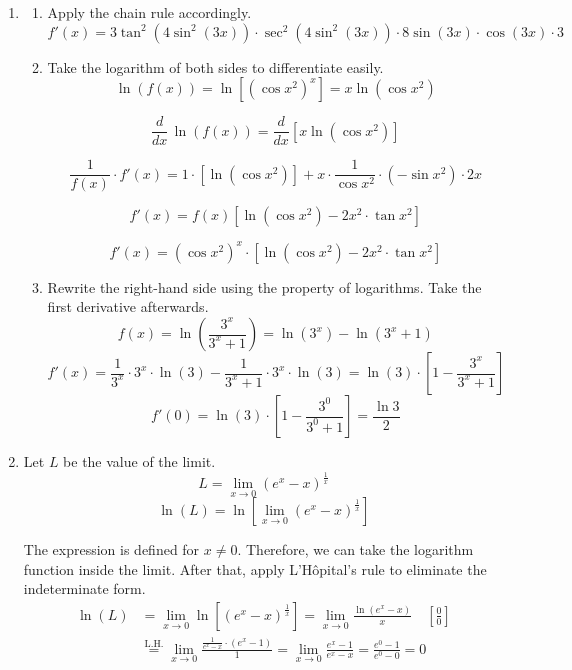 \documentclass[a4paper, 12pt]{article}
\begin{document}
\begin{enumerate}[leftmargin=*,label=\textbf{\arabic*.}]
\item
\begin{enumerate}[leftmargin=*,label=\textbf{\alph*.}]
\item Apply the chain rule accordingly.
\[\boxed{f'(x) = 3\tan^2\left(4\sin^2(3x)\right)\cdot \sec^2\left(4\sin^2(3x)\right)\cdot8\sin(3x)\cdot \cos(3x)\cdot 3}\]

\item Take the logarithm of both sides to differentiate easily.
\[\ln\left(f(x)\right)=\ln\left[\left(\cos x^2\right)^x\right]=x\ln\left(\cos x^2\right)\]

\[\frac{d}{dx}\,\ln\left(f(x)\right)=\frac{d}{dx}\left[x\ln\left(\cos x^2\right)\right]\]

\[\frac1{f(x)}\cdot f'(x)=1\cdot\left[\ln\left(\cos x^2\right)\right]+x\cdot\frac1{\cos x^2}\cdot\left(-\sin x^2\right)\cdot2x\]

\[f'(x)=f(x)\left[\ln\left(\cos x^2\right)-2x^2\cdot\tan x^2\right]\]

\[\boxed{f'(x)=\left(\cos x^2\right)^x\cdot\left[\ln\left(\cos x^2\right)-2x^2\cdot\tan x^2\right]}\]

\item Rewrite the right-hand side using the property of logarithms. Take the first derivative afterwards.
\[f(x)=\ln\left(\frac{3^x}{3^x+1}\right)=\ln\left(3^x\right)-\ln\left(3^x+1\right)\]
\[f'(x)=\frac1{3^x}\cdot 3^x\cdot\ln(3)-\frac1{3^x+1}\cdot3^x\cdot\ln(3)=\ln(3)\cdot\left[1-\frac{3^x}{3^x+1}\right]\]
\[f'(0)=\ln(3)\cdot\left[1-\frac{3^0}{3^0+1}\right]=\boxed{\frac{\ln3}2}\]
\end{enumerate}

\item Let $L$ be the value of the limit.
\[L = \lim_{x\to0}\left( e^x-x\right)^{\frac1x}\]
\[\ln(L) = \ln\left[\lim_{x\to0}\left( e^x-x\right)^{\frac1x}\right]\]

The expression is defined for $x\neq0$. Therefore, we can take the logarithm function inside the limit. After that, apply L'Hôpital's rule to eliminate the indeterminate form.
\begin{align*}\ln(L)&=\lim_{x\to0}\ln\left[\left( e^x-x\right)^{\frac1x}\right]=\lim_{x\to0}\frac{\ln\left( e^x-x\right)}x\quad\left[\frac00\right]\\[1em]&\overset{\text{L.H.}}{=}\lim_{x\to0}\frac{\displaystyle\frac{1}{ e^x-x}\cdot\left( e^x-1\right)}{1}=\lim_{x\to0}\frac{ e^x-1}{ e^x-x}=\frac{ e^0-1}{ e^0-0}=0\end{align*}


\end{enumerate}
\end{document}
